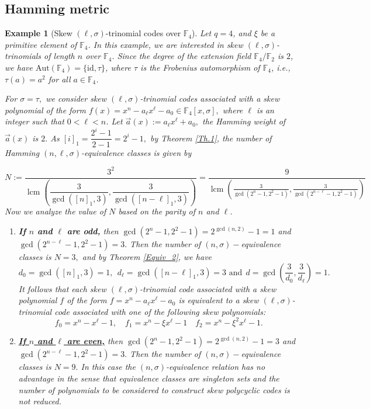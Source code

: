 \documentclass[12pt,paper]{article}
\theoremstyle{plain}
\newtheorem{example}[theorem]{Example}
\DeclareMathOperator{\lcm}{lcm}
\begin{document}
\subsection{Hamming metric}

\begin{example}[Skew $(\ell,\sigma)$-trinomial  codes  over $\mathbb{F}_4$] 

Let $q = 4$, and $\xi$ be a primitive element of $\mathbb{F}_4$. In this example, we are interested in skew $(\ell,\sigma)$-trinomials of length $n$ over $\mathbb{F}_4$. Since the degree of the extension field $\mathbb{F}_4/\mathbb{F}_2$ is $2$, we have $\text{Aut}(\mathbb{F}_4) = \{\text{id}, \tau\}$, where $\tau$ is the Frobenius automorphism of $\mathbb{F}_4$, i.e., $\tau(a) = a^2$ for all $a\in \mathbb{F}_4$. 

For $\sigma=\tau,$ we consider skew $(\ell,\sigma)$-trinomial  codes   associated with  a skew polynomial of the form $f(x) =x^{n}-a_{\ell}x^{\ell}-a_0\in \mathbb{F}_4[x,\sigma],$
 where $\ell$ is an integer such that $0<\ell <n$.  Let $\vec{a}(x):=   a_{\ell}x^{\ell}+a_0 ,$  the Hamming weight of $ \vec{a}(x) $ is  $2.$
 As $[i]_1= \dfrac{2^i-1}{2-1}=2^i-1,$  by  Theorem  \ref{Th.1}, the number of Hamming $(n,\ell, \sigma)$-equivalence classes is given by  
 
 $$N:=\dfrac{3^2}{ \lcm\left(\dfrac{3}{\gcd( [n]_1 ,3 )}, \dfrac{3}{\gcd( [n-\ell]_1,3)}  \right)}    
      =\dfrac{9}{ \lcm\left( \frac{3}{\gcd( 2^{n}-1 ,  2^2-1 )}, \frac{3}{\gcd( 2^{n-\ell}-1 ,  2^2-1 )}\right) }  
 $$ 
 Now we analyze the value of $N$  based on the parity of $n$ and $\ell$.
 \begin{enumerate}
\item \textbf{If $n$ and $\ell$ are odd,} then $ \gcd( 2^{n}-1 ,  2^2-1 )=2^{\gcd(n,2)}-1=1 $ and  $ \gcd( 2^{n-\ell}-1 ,  2^2-1 )= 3.$ 
Then the number of $(n,\sigma)-$equivalence classes is $N=3,$ and by Theorem \ref{Equiv_2}, we have 
     $$d_0=\gcd( [n]_1, 3)= 1,\ \ d_{\ell}= \gcd([n-\ell]_1, 3)= 3 \text{ and} \ \  d=\gcd\left( \frac{3}{d_0}, \frac{3}{d_{\ell}}\right)=1.$$
 It follows that each  skew $(\ell,\sigma)$-trinomial  code associated with a skew  polynomial $f$ of the form  $f =x^{n}- a_{\ell} x^{\ell}-a_0$ is equivalent to a skew $(\ell,\sigma)$-trinomial  code  associated with one of the following  skew polynomials: 
 $$f_{0}= x^{n} - x^{\ell} - 1 , \quad f_{1}= x^{n} - \xi x^{\ell} - 1 \quad  f_{2}= x^{n} - \xi^2 x^{\ell} - 1 .  $$
 
     \item \underline{\textbf{If $n$ and $\ell$ are even,}} 
     then $ \gcd( 2^{n}-1 ,  2^2-1 )=2^{\gcd(n,2)}-1=3 $ and  $ \gcd( 2^{n-\ell}-1 ,  2^2-1 )= 3.$ 
Then the number of $(n,\sigma)-$equivalence classes is $N=9.$ In this case the $(n,\sigma)$-equivalence relation has no advantage in the sense that equivalence classes are singleton sets and the number of polynomials to be considered to construct skew polycyclic codes is not reduced.  


\end{enumerate}
\end{example}
\end{document}
